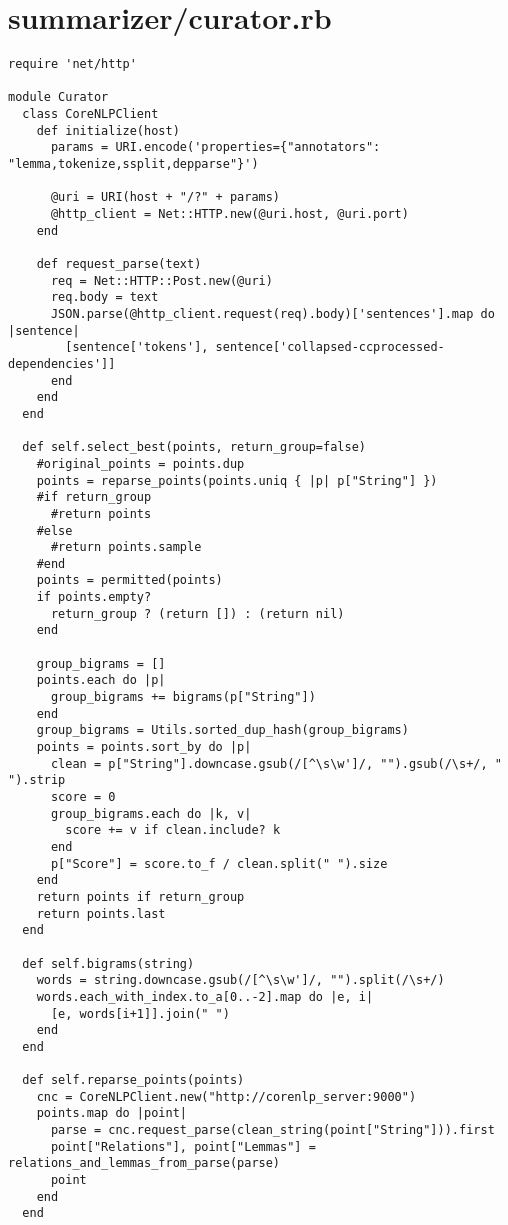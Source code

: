 \documentclass{article}
\begin{document}
\section*{summarizer/curator.rb}
\begin{verbatim}
require 'net/http'

module Curator
  class CoreNLPClient
    def initialize(host)
      params = URI.encode('properties={"annotators": "lemma,tokenize,ssplit,depparse"}')

      @uri = URI(host + "/?" + params)
      @http_client = Net::HTTP.new(@uri.host, @uri.port)
    end

    def request_parse(text)
      req = Net::HTTP::Post.new(@uri)
      req.body = text
      JSON.parse(@http_client.request(req).body)['sentences'].map do |sentence|
        [sentence['tokens'], sentence['collapsed-ccprocessed-dependencies']]
      end
    end
  end

  def self.select_best(points, return_group=false)
    #original_points = points.dup
    points = reparse_points(points.uniq { |p| p["String"] })
    #if return_group
      #return points
    #else
      #return points.sample
    #end
    points = permitted(points)
    if points.empty?
      return_group ? (return []) : (return nil)
    end

    group_bigrams = []
    points.each do |p|
      group_bigrams += bigrams(p["String"])
    end
    group_bigrams = Utils.sorted_dup_hash(group_bigrams)
    points = points.sort_by do |p|
      clean = p["String"].downcase.gsub(/[^\s\w']/, "").gsub(/\s+/, " ").strip
      score = 0
      group_bigrams.each do |k, v|
        score += v if clean.include? k
      end
      p["Score"] = score.to_f / clean.split(" ").size
    end
    return points if return_group
    return points.last
  end

  def self.bigrams(string)
    words = string.downcase.gsub(/[^\s\w']/, "").split(/\s+/)
    words.each_with_index.to_a[0..-2].map do |e, i|
      [e, words[i+1]].join(" ")
    end
  end

  def self.reparse_points(points)
    cnc = CoreNLPClient.new("http://corenlp_server:9000")
    points.map do |point|
      parse = cnc.request_parse(clean_string(point["String"])).first
      point["Relations"], point["Lemmas"] = relations_and_lemmas_from_parse(parse)
      point
    end
  end


\end{verbatim}
\end{document}
